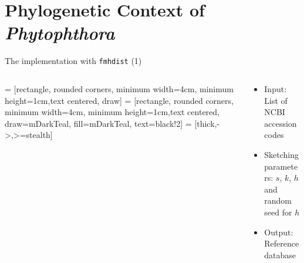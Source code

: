 \documentclass[aspectratio=169]{beamer}
\begin{document}
\section{Phylogenetic Context of \textit{Phytophthora}}
\begin{frame}{The implementation with \texttt{fmhdist} (1)}
    \begin{columns}
        \begin{column}{0.5\textwidth}
             = [rectangle, rounded corners, minimum width=4cm, minimum height=1cm,text centered, draw]
             = [rectangle, rounded corners, minimum width=4cm, minimum height=1cm,text centered, draw=mDarkTeal, fill=mDarkTeal, text=black!2]
             = [thick,->,>=stealth]
        \end{column}
        \begin{column}{0.5\textwidth}
            \begin{itemize}
                \item Input: List of NCBI accession codes
                \item Sketching parameters: $s$, $k$, $h$ and random seed for $h$
                \item Output: Reference database
            \end{itemize}
        \end{column}
        \end{columns}   
\end{frame}
\end{document}
